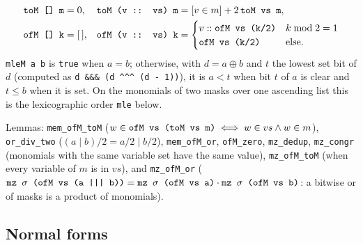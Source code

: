\begin{definition}[Masks]\label{def:lean-pathsum-masks}
\begin{align*}
\textnormal{\texttt{toM [] m}} &= 0, & \textnormal{\texttt{toM (\allowbreak{}v :: vs) m}} &= [v\in m] + 2\,\textnormal{\texttt{toM vs m}},\\
\textnormal{\texttt{ofM [] k}} &= [\,], & \textnormal{\texttt{ofM (\allowbreak{}v :: vs) k}} &=
 \begin{cases} v :: \textnormal{\texttt{ofM vs (\allowbreak{}k/2)}} & k\bmod 2 = 1\\ \textnormal{\texttt{ofM vs (\allowbreak{}k/2)}} & \text{else.}\end{cases}
\end{align*}
\textnormal{\texttt{mleM a b}} is \textnormal{\texttt{true}} when $a=b$; otherwise, with $d = a\oplus b$ and $t$ the lowest set
bit of $d$ (computed as \textnormal{\texttt{d \&\&\& (\allowbreak{}d \^{}\^{}\^{} (\allowbreak{}d -{} 1))}}), it is $a<t$ when bit $t$ of $a$ is clear and
$t\le b$ when it is set. On the monomials of two masks over one ascending list this is the
lexicographic order \textnormal{\texttt{mle}} below.
\end{definition}

\noindent Lemmas: \textnormal{\texttt{mem\_\allowbreak{}ofM\_\allowbreak{}toM}} ($w\in\textnormal{\texttt{ofM vs (\allowbreak{}toM vs m)}}\iff w\in vs\wedge w\in m$),
\textnormal{\texttt{or\_\allowbreak{}div\_\allowbreak{}two}} ($(a \mathbin{|} b)/2 = a/2 \mathbin{|} b/2$), \textnormal{\texttt{mem\_\allowbreak{}ofM\_\allowbreak{}or}},
\textnormal{\texttt{ofM\_\allowbreak{}zero}}, \textnormal{\texttt{mz\_\allowbreak{}dedup}}, \textnormal{\texttt{mz\_\allowbreak{}congr}} (monomials with the same variable set have the
same value), \textnormal{\texttt{mz\_\allowbreak{}ofM\_\allowbreak{}toM}} (when every variable of $m$ is in $vs$), and \textnormal{\texttt{mz\_\allowbreak{}ofM\_\allowbreak{}or}}
($\textnormal{\texttt{mz \ensuremath{\sigma} (\allowbreak{}ofM vs (\allowbreak{}a ||| b))}} = \textnormal{\texttt{mz \ensuremath{\sigma} (\allowbreak{}ofM vs a)}}\cdot\textnormal{\texttt{mz \ensuremath{\sigma} (\allowbreak{}ofM vs b)}}$: a bitwise
or of masks is a product of monomials).

\subsection{Normal forms}

